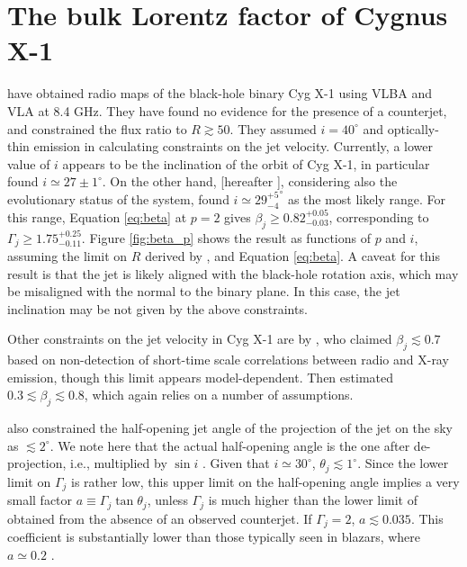 \section{The bulk Lorentz factor of Cygnus X-1}
\label{sec:CygX-1}
 have obtained radio maps of the black-hole binary Cyg X-1 using VLBA and VLA at 8.4 GHz. They have found no evidence for the presence of a counterjet, and constrained the flux ratio to $R \gtrsim 50$. They assumed $ i = 40^{\circ} $ and optically-thin emission in calculating constraints on the jet velocity. Currently, a lower value of $i$ appears to be the inclination of the orbit of Cyg X-1, in particular  found $ i \simeq 27 \pm 1^{\circ} $. On the other hand, \cite{Ziolkowski-2014-MNRAS} [hereafter ], considering also the evolutionary status of the system, found $i \simeq {29^{+5}_{-4}}^{\circ}$ as the most likely range. For this range, Equation \ref{eq:beta} at $p = 2$ gives $ \beta_j \geq 0.82_{-0.03}^{+0.05} $, corresponding to $\Gamma_j \geq 1.75_{-0.11}^{+0.25}$. Figure \ref{fig:beta_p} shows the result as functions of $p$ and $i$, assuming the limit on $R$ derived by , and Equation \ref{eq:beta}. A caveat for this result is that the jet is likely aligned with the black-hole rotation axis, which may be misaligned with the normal to the binary plane. In this case, the jet inclination may be not given by the above constraints.

Other constraints on the jet velocity in Cyg X-1 are by \cite{Gleissner_et_al.-2004-A&A}, who claimed $\beta_j \lesssim 0.7$ based on non-detection of short-time scale correlations between radio and X-ray emission, though this limit appears model-dependent. Then \cite{Malzac_Belmont_Fabian-2009-MNRAS} estimated $0.3 \lesssim \beta_j \lesssim 0.8$, which again relies on a number of assumptions.

 also constrained the half-opening jet angle of the projection of the jet on the sky as $\lesssim 2^{\circ}$. We note here that the actual half-opening angle is the one after de-projection, i.e., multiplied by $\sin i$ \citep{Konigl-1981-ApJ}. Given that $i \simeq 30^{\circ}$, $\theta_j \lesssim 1^{\circ}$. Since the lower limit on $\Gamma_j$ is rather low, this upper limit on the half-opening angle implies a very small factor $a \equiv \Gamma_j \tan \theta_j$, unless $\Gamma_j$ is much higher than the lower limit of  obtained from the absence of an observed counterjet. If $\Gamma_j = 2 $, $ a \lesssim 0.035$. This coefficient is substantially lower than those typically seen in blazars, where $a \simeq 0.2$ \citep{Clausen-Brown_et_al.-2013-A&A}.

